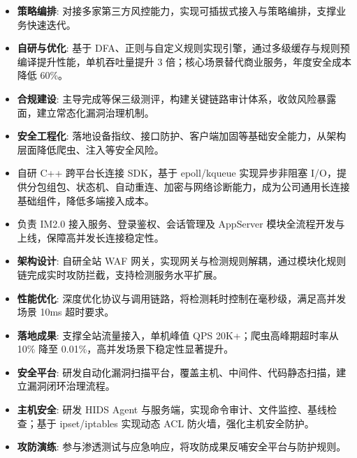 \begin{itemize}
    \item \textbf{策略编排}: 对接多家第三方风控能力，实现可插拔式接入与策略编排，支撑业务快速迭代。
    \item \textbf{自研与优化}: 基于 DFA、正则与自定义规则实现引擎，通过多级缓存与规则预编译提升性能，单机吞吐量提升 3 倍；核心场景替代商业服务，年度安全成本降低 60\%。
\end{itemize}

\begin{itemize}
    \item \textbf{合规建设}: 主导完成等保三级测评，构建关键链路审计体系，收敛风险暴露面，建立常态化漏洞治理机制。
    \item \textbf{安全工程化}: 落地设备指纹、接口防护、客户端加固等基础安全能力，从架构层面降低爬虫、注入等安全风险。
\end{itemize}

\vspace{0.2cm}


\begin{itemize}
    \item 自研 C++ 跨平台长连接 SDK，基于 epoll/kqueue 实现异步非阻塞 I/O，提供分包组包、状态机、自动重连、加密与网络诊断能力，成为公司通用长连接基础组件，降低多端接入成本。
    \item 负责 IM2.0 接入服务、登录鉴权、会话管理及 AppServer 模块全流程开发与上线，保障高并发长连接稳定性。
\end{itemize}

\begin{itemize}
    \item \textbf{架构设计}: 自研全站 WAF 网关，实现网关与检测规则解耦，通过模块化规则链完成实时攻防拦截，支持检测服务水平扩展。
    \item \textbf{性能优化}: 深度优化协议与调用链路，将检测耗时控制在毫秒级，满足高并发场景 10ms 超时要求。
    \item \textbf{落地成果}: 支撑全站流量接入，单机峰值 QPS 20K+；爬虫高峰期超时率从 10\% 降至 0.01\%，高并发场景下稳定性显著提升。
\end{itemize}

\begin{itemize}
    \item \textbf{安全平台}: 研发自动化漏洞扫描平台，覆盖主机、中间件、代码静态扫描，建立漏洞闭环治理流程。
    \item \textbf{主机安全}: 研发 HIDS Agent 与服务端，实现命令审计、文件监控、基线检查；基于 ipset/iptables 实现动态 ACL 防火墙，强化主机安全防护。
    \item \textbf{攻防演练}: 参与渗透测试与应急响应，将攻防成果反哺安全平台与防护规则。
\end{itemize}

